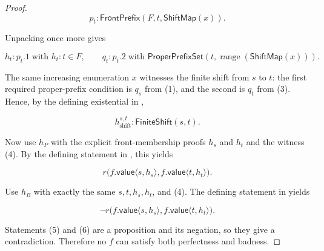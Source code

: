 \begin{proof}
\[
p_t:\mathsf{FrontPrefix}(F,t,\mathsf{ShiftMap}(x)).
\]

Unpacking  once more gives

\[
h_t:p_t.1\;\text{with }h_t:t\in F,
\qquad
q_t:p_t.2\;\text{with }
\mathsf{ProperPrefixSet}
   (t,\operatorname{range}(\mathsf{ShiftMap}(x))).
\tag{3}
\]

The same increasing enumeration $x$ witnesses the finite shift from $s$ to
$t$: the first required proper-prefix condition is $q_s$ from (1), and the
second is $q_t$ from (3).  Hence, by the defining existential in
,

\[
h_{\mathrm{shift}}^{s,t}:\mathsf{FiniteShift}(s,t).
\tag{4}
\]

Now use $h_P$ with the explicit front-membership proofs $h_s$ and $h_t$
and the witness (4).  By the defining statement in
, this yields

\[
r\bigl(f.\mathsf{value}\langle s,h_s\rangle,
       f.\mathsf{value}\langle t,h_t\rangle\bigr).
\tag{5}
\]

Use $h_B$ with exactly the same $s,t,h_s,h_t$, and (4).  The defining
statement in  yields

\[
\neg r\bigl(f.\mathsf{value}\langle s,h_s\rangle,
            f.\mathsf{value}\langle t,h_t\rangle\bigr).
\tag{6}
\]

Statements (5) and (6) are a proposition and its negation, so they give a
contradiction.  Therefore no $f$ can satisfy both perfectness and badness.
\end{proof}
